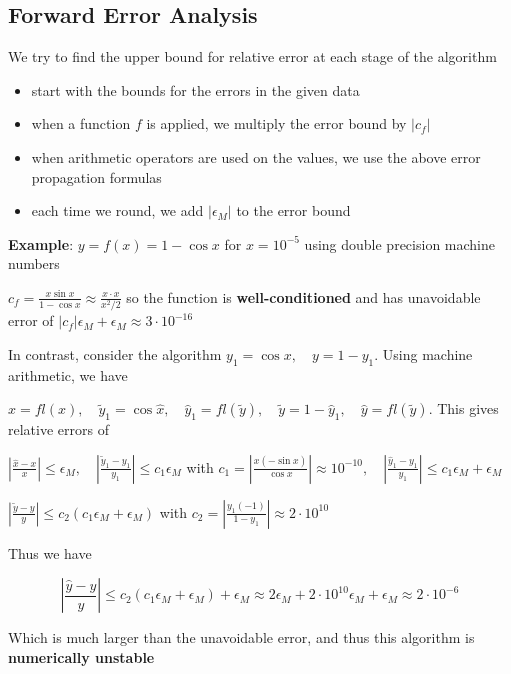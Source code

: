 \documentclass{article}
\begin{document}
  \subsection{Forward Error Analysis}
  We try to find the upper bound for relative error at each stage of the algorithm
  \begin{itemize}
    \item start with the bounds for the errors in the given data
    \item when a function $f$ is applied, we multiply the error bound by $|c_f|$
    \item when arithmetic operators are used on the values, we use the above error propagation formulas
    \item each time we round, we add $|\epsilon_M|$ to the error bound
  \end{itemize}

  \textbf{Example}: $y = f(x) = 1 - \cos{x}$ for $x = 10^{-5}$ using double precision machine numbers

  $c_f = \frac{x \sin{x}}{1 - \cos{x}} \approx \frac{x \cdot x}{x^2/2}$ so the function is \textbf{well-conditioned} and has unavoidable error of $|c_f| \epsilon_M + \epsilon_M \approx 3 \cdot 10^{-16}$

  \medskip

  In contrast, consider the algorithm $y_1 = \cos{x}, \quad y = 1 - y_1$. Using machine arithmetic, we have

  $\hat{x} = fl(x), \quad \tilde{y}_1 = \cos{\hat{x}}, \quad \hat{y}_1 = fl(\tilde{y}), \quad \tilde{y} = 1 - \hat{y}_1, \quad \hat{y} = fl(\tilde{y})$. This gives relative errors of

  $\left| \frac{\hat{x} - x}{x} \right| \leq \epsilon_M, \quad \left| \frac{\tilde{y}_1 - y_1}{y_1} \right| \leq c_1 \epsilon_M$ with $c_1 = \left| \frac{x(-\sin{x})}{\cos{x}} \right| \approx 10^{-10}, \quad \left| \frac{\hat{y}_1 - y_1}{y_1} \right| \leq c_1 \epsilon_M + \epsilon_M$

  $\left| \frac{\tilde{y} - y}{y} \right| \leq c_2(c_1 \epsilon_M + \epsilon_M)$ with $c_2 = \left| \frac{y_1 (-1)}{1 - y_1}\right| \approx 2 \cdot 10^{10}$

  Thus we have

  \[\left| \frac{\hat{y} - y}{y} \right| \leq c_2(c_1 \epsilon_M + \epsilon_M) + \epsilon_M \approx 2 \epsilon_M + 2 \cdot 10^{10} \epsilon_M + \epsilon_M \approx 2 \cdot 10^{-6}\]

  Which is much larger than the unavoidable error, and thus this algorithm is \textbf{numerically unstable}
\end{document}
